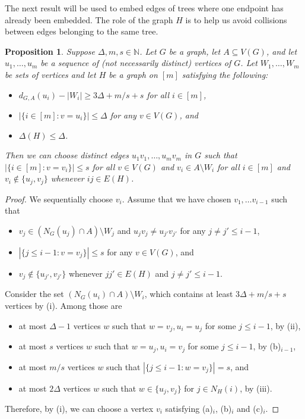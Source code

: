 \documentclass[a4paper, 11pt, reqno]{amsart}
\newtheorem{proposition}[definition]{Proposition}
\numberwithin{equation}{section}
\newcommand{\1}{{\rm 1\hspace*{-0.4ex}%
\rule{0.1ex}{1.52ex}\hspace*{0.2ex}}}
\newcommand{\N}{\mathbb N}
\begin{document}
The next result will be used to embed edges of trees where one endpoint has already been embedded. The role of the graph $H$ is to help us avoid collisions between edges belonging to the same tree.
\begin{proposition}\label{prop: sparse edge embedding}
Suppose $\Delta, m, s \in \N$.
Let $G$ be a graph, let $A\subseteq V(G)$, and 
let $u_1,\dots, u_m$ be a sequence of (not necessarily distinct) vertices of $G$. Let $W_1,\dots, W_m$ be sets of vertices and let $H$ be a graph on $[m]$ satisfying the following:
\begin{itemize}
\item[(i)] $d_{G,A}(u_i)-|W_i|\geq 3\Delta + m/s+s$ for all $i\in [m]$,
\item[(ii)] $|\{i\in [m]: v=u_i\}| \leq \Delta$ for any $v\in V(G)$, and
\item[(iii)] $\Delta(H)\leq \Delta$.
\end{itemize}
Then we can choose distinct edges $u_1v_1,\dots, u_mv_m$ in $G$ such that $|\{i\in [m]: v=v_i\}|\leq s$ for all $v\in V(G)$ 
and $v_i\in A\setminus W_i$ for all $i\in [m]$ and $v_i\notin \{u_j, v_{j}\}$ whenever $ij\in E(H)$.
\end{proposition}
\begin{proof}
We sequentially choose $v_i$. 
Assume that we have chosen $v_1,\dots v_{i-1}$ such that 
\begin{itemize}
\item[(a)$_{i-1}$] $v_j\in (N_{G}(u_j)\cap A)\setminus W_j$ and $u_jv_j\neq u_{j'}v_{j'}$ for any $j\neq j' \leq i-1$,
\item[(b)$_{i-1}$] $|\{j\leq i-1: v=v_j\}|\leq s$ for any $v \in V(G)$, and
\item[(c)$_{i-1}$] $v_j\notin\{ u_{j'}, v_{j'}\}$ whenever $jj'\in E(H)$ and $j\neq j'\leq i-1$.
\end{itemize}
Consider the set $(N_{G}(u_i)\cap A)\setminus W_i$, which contains at least $3\Delta+ m/s + s$ vertices by (i). 
Among those are 
\begin{itemize}
	\item at most $\Delta-1$ vertices $w$ such that $w=v_j, u_i=u_j $ for some $j\leq i-1$, by (ii),
	\item at most $s$ vertices $w$ such that $w=u_j,u_i=v_j$ for some $j\leq i-1$, by (b)$_{i-1}$,
	\item at most $m/s$ vertices $w$ such that $|\{ j\leq i-1: w=v_j \}|= s$, and
	\item at most $2\Delta$ vertices $w$ such that $w\in\{u_j,v_{j}\}$ for $j\in N_{H}(i)$, by (iii). 
\end{itemize}
Therefore, by (i), we can choose a vertex $v_i$ satisfying (a)$_{i}$, (b)$_{i}$ and (c)$_{i}$.
\end{proof}
\end{document}

